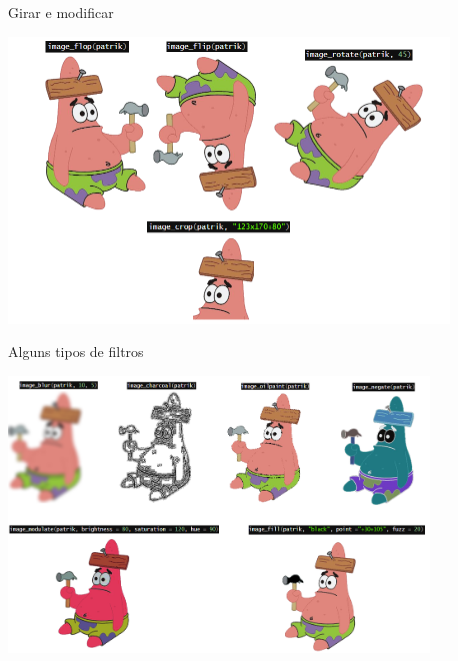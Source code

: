 \documentclass[
  ignorenonframetext,
]{beamer}
\begin{document}
\begin{frame}{Girar e modificar}
\protect\hypertarget{girar-e-modificar}{}

\small

\includegraphics[width=4.6in]{IMAGENS/girar_modificar}

\begin{center}
\tiny{}
\end{center}

\end{frame}

\begin{frame}{Alguns tipos de filtros}
\protect\hypertarget{alguns-tipos-de-filtros}{}

\small

\includegraphics[width=4.4in]{IMAGENS/filtros}

\begin{center}
\tiny{}
\end{center}

\end{frame}
\end{document}
